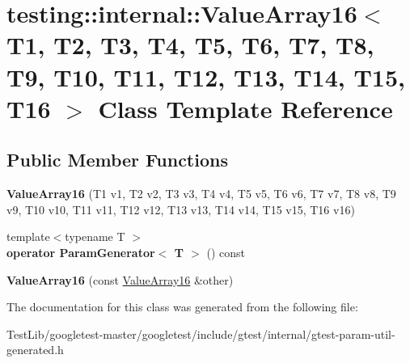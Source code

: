 \hypertarget{classtesting_1_1internal_1_1ValueArray16}{}\section{testing\+:\+:internal\+:\+:Value\+Array16$<$ T1, T2, T3, T4, T5, T6, T7, T8, T9, T10, T11, T12, T13, T14, T15, T16 $>$ Class Template Reference}
\label{classtesting_1_1internal_1_1ValueArray16}
\subsection*{Public Member Functions}
\begin{DoxyCompactItemize}
\item 
\mbox{\label{classtesting_1_1internal_1_1ValueArray16_ac12b3a15ab5418665a97b4a225438529}} 
{\bfseries Value\+Array16} (T1 v1, T2 v2, T3 v3, T4 v4, T5 v5, T6 v6, T7 v7, T8 v8, T9 v9, T10 v10, T11 v11, T12 v12, T13 v13, T14 v14, T15 v15, T16 v16)
\item 
\mbox{\label{classtesting_1_1internal_1_1ValueArray16_ae4f1174da079ca0d674497f5e452274c}} 
{\footnotesize template$<$typename T $>$ }\\{\bfseries operator Param\+Generator$<$ T $>$} () const
\item 
\mbox{\label{classtesting_1_1internal_1_1ValueArray16_a867f767c90905de55a8b4933881d144b}} 
{\bfseries Value\+Array16} (const \hyperlink{classtesting_1_1internal_1_1ValueArray16}{Value\+Array16} \&other)
\end{DoxyCompactItemize}


The documentation for this class was generated from the following file\+:\begin{DoxyCompactItemize}
\item 
Test\+Lib/googletest-\/master/googletest/include/gtest/internal/gtest-\/param-\/util-\/generated.\+h\end{DoxyCompactItemize}
